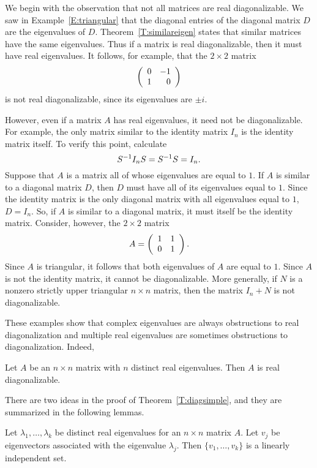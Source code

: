 We begin with the observation that not all matrices are real
diagonalizable.  We saw in Example~\ref{E:triangular} that the
diagonal entries of the diagonal matrix $D$ are the eigenvalues
of $D$. Theorem~\ref{T:similareigen} states that similar
matrices have the same eigenvalues.  Thus if a matrix is real
diagonalizable, then it must have real eigenvalues.  It follows,
for example, that the $2\times 2$ matrix 
\[
\left(\begin{array}{rr} 0 & -1\\ 1 &0\end{array}\right)
\]
is not real diagonalizable, since its eigenvalues are $\pm i$. 

However, even if a matrix $A$ has real eigenvalues, it need not
be diagonalizable.  For example, the only matrix similar to the
identity matrix $I_n$ is the identity matrix itself.  To verify
this point, calculate
\[
S^{-1} I_n S = S^{-1} S = I_n.
\]
Suppose that $A$ is a matrix all of whose eigenvalues are equal
to $1$.  If $A$ is similar to a diagonal matrix $D$, then $D$
must have all of its eigenvalues equal to $1$.  Since the
identity matrix is the only diagonal matrix with all eigenvalues
equal to $1$, $D=I_n$.  So, if $A$ is similar to a diagonal
matrix, it must itself be the identity matrix.  Consider,
however, the $2\times 2$ matrix
\[
A=\left(\begin{array}{rr} 1 & 1\\ 0 &1\end{array}\right).
\]
Since $A$ is triangular, it follows that both eigenvalues of $A$
are equal to $1$.  Since $A$ is not the identity matrix, it
cannot be diagonalizable. More generally, if $N$ is a nonzero
strictly upper triangular $n\times n$ matrix, then the matrix
$I_n+N$ is not diagonalizable.  

These examples show that complex eigenvalues are always
obstructions to real diagonalization and multiple real eigenvalues
are sometimes obstructions to diagonalization.  Indeed, 

\begin{thm}  \label{T:diagsimple}
Let $A$ be an $n\times n$ matrix with $n$ distinct real
eigenvalues.  
Then $A$ is real diagonalizable.
\end{thm}  

There are two ideas in the proof of Theorem~\ref{T:diagsimple}, and 
they are summarized in the following lemmas.

\begin{lemma} \label{L:simpleeigen}
Let $\lambda_1,\ldots,\lambda_k$ be distinct real eigenvalues
for an $n\times n$ matrix $A$.  Let $v_j$ be eigenvectors
associated with the eigenvalue $\lambda_j$.  Then
$\{v_1,\ldots,v_k\}$ is a linearly independent set.
\end {lemma} 

